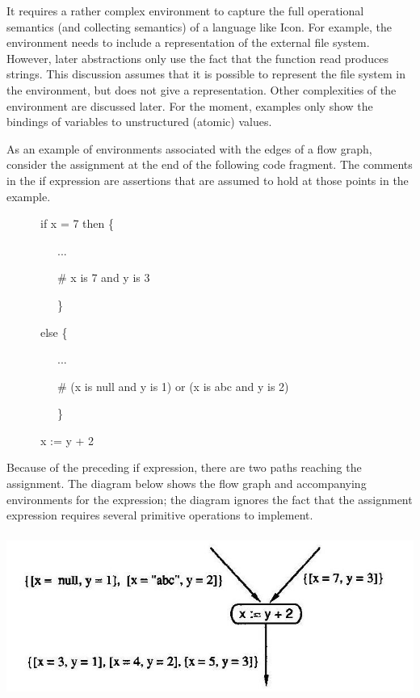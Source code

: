 It requires a rather complex environment to capture the full
operational semantics (and collecting semantics) of a language like
Icon. For example, the environment needs to include a representation
of the external file system.  However, later abstractions only use the
fact that the function read produces strings. This discussion assumes
that it is possible to represent the file system in the environment,
but does not give a representation. Other complexities of the
environment are discussed later. For the moment, examples only show
the bindings of variables to unstructured (atomic) values.

As an example of environments associated with the edges of a flow
graph, consider the assignment at the end of the following code
fragment. The comments in the if expression are assertions that are
assumed to hold at those points in the example.

{\ttfamily\mdseries
\ \ \ \ \ \ if x = 7 then \{}

{\ttfamily\mdseries
\ \ \ \ \ \ \ \ \ ...}

{\ttfamily\mdseries
\ \ \ \ \ \ \ \ \ \# x is 7 and y is 3}

{\ttfamily\mdseries
\ \ \ \ \ \ \ \ \ \}}

{\ttfamily\mdseries
\ \ \ \ \ \ else \{}

{\ttfamily\mdseries
\ \ \ \ \ \ \ \ \ ...}

{\ttfamily\mdseries
\ \ \ \ \ \ \ \ \ \# (x is null and y is 1) or (x is {\textquotedbl}abc{\textquotedbl} and y is 2)}

{\ttfamily\mdseries
\ \ \ \ \ \ \ \ \ \}}

{\ttfamily\mdseries
\ \ \ \ \ \ x := y + 2}


Because of the preceding if expression, there are two paths reaching
the assignment. The diagram below shows the flow graph and
accompanying environments for the expression; the diagram ignores the
fact that the assignment expression requires several primitive
operations to implement.


 \includegraphics[width=6.0in,height=2.1in]{kw/figure3-5.png}  


